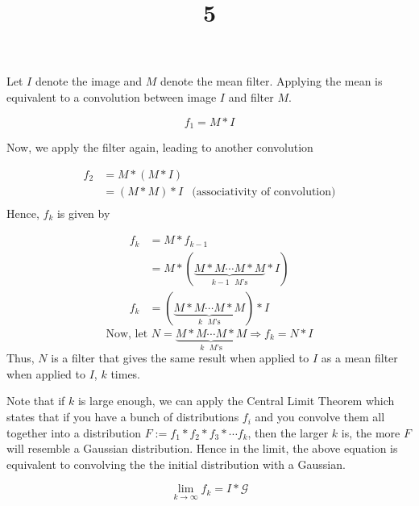 \documentclass[a4paper]{article}
\title{5}
\date{}
\begin{document}
\maketitle

Let $I$ denote the image and $M$ denote the mean filter. Applying the mean is equivalent to a convolution between image $I$ and filter $M$.

\begin{equation}
    f_1 = M \ast I 
\end{equation}

Now, we apply the filter again, leading to another convolution

\begin{align}
     f_2 & = M \ast (M \ast I) &\\
         & = (M \ast M) \ast I &\text{(associativity of convolution)}\\
\end{align}
Hence, $f_k$ is given by

\begin{align}
    f_k &= M \ast f_{k-1}\\
        &= M \ast ( \underbrace{M \ast M \cdots M \ast M}_{k-1 \text{ $M$'s}} \ast I )\\
    f_k    &= (\underbrace{M \ast M \cdots M \ast M}_{k \text{ $M$'s}}) \ast I 
\end{align}
\begin{equation}
    \text{Now, let } N=\underbrace{M \ast M \cdots M \ast M}_{k \text{ $M$'s}} \Rightarrow f_k = N\ast I
\end{equation}
Thus, $N$ is a filter that gives the same result when applied to $I$ as a mean filter when applied to $I$, $k$ times.


Note that if $k$ is large enough, we can apply the Central Limit Theorem which states that if you have a bunch of distributions $f_i$ and you convolve them all together into a distribution $F:= f_1\ast f_2\ast f_3\ast \cdots f_k$, then the larger $k$ is, the more $F$ will resemble a Gaussian distribution. Hence in the limit, the above equation is equivalent to convolving the the initial distribution with a Gaussian.

\begin{equation}
    \lim_{k\rightarrow\infty}f_{k} = I*\mathcal{G}
\end{equation}
\end{document}
